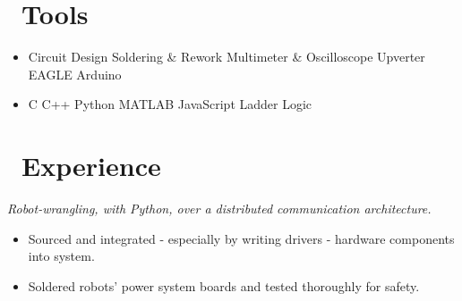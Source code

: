\documentclass{resume}
\begin{document}



\section{\faWrench\ Tools}

\begin{itemize}[parsep=0.5ex]
  \item %
  Circuit Design\textperiodcentered
  Soldering \& Rework\textperiodcentered
  Multimeter \& Oscilloscope\textperiodcentered
  Upverter\textperiodcentered
  EAGLE\textperiodcentered
  Arduino

  \item %
  C\textperiodcentered 
  C++\textperiodcentered
  Python\textperiodcentered
  MATLAB\textperiodcentered
  JavaScript\textperiodcentered
  Ladder Logic

\end{itemize}

\section{\faLineChart\ Experience}

\textit{Robot-wrangling, with Python, over a distributed communication architecture.}
\begin{itemize}
  \item Sourced and integrated - especially by writing drivers - hardware components into system.
  \item Soldered robots' power system boards and tested thoroughly for safety.
\end{itemize}
\begin{comment}
  Informal intro to ML / N-nets, FK / IK, Grasping, FSM, DB (ES)
  People skills: pair-programming, 1-on-1, standups, blog posts, Happy Hour, AI planning, CI for internal processes, HW concept review
  Python fu: rapid prototyping / scripting AND enterprise-level code --> classes, exception-handling, logging, PDB debugging, linting, documentation
\end{comment}
\end{document}
